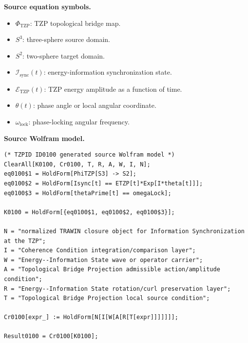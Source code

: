 \begin{minipage}[t]{0.49\linewidth}
\begingroup
\small
\raggedright
\textbf{Source equation symbols.}\par
\begin{itemize}[leftmargin=1.35em,itemsep=1pt,topsep=1pt,parsep=0pt]
    \item $\Phi_{\mathrm{TZP}}$: TZP topological bridge map.
    \item $S^3$: three-sphere source domain.
    \item $S^2$: two-sphere target domain.
    \item $\mathcal{I}_{\mathrm{sync}}(t)$: energy-information synchronization state.
    \item $\mathcal{E}_{\mathrm{TZP}}(t)$: TZP energy amplitude as a function of time.
    \item $\theta(t)$: phase angle or local angular coordinate.
    \item $\omega_{\mathrm{lock}}$: phase-locking angular frequency.
\end{itemize}
\endgroup
\end{minipage}\hfill
\begin{minipage}[t]{0.47\linewidth}
\begingroup
\scriptsize
\raggedright
\textbf{Source Wolfram model.}\par
\begin{Verbatim}[fontsize=\tiny,breaklines=true,breakanywhere=true]
(* TZPID ID0100 generated source Wolfram model *)
ClearAll[K0100, Cr0100, T, R, A, W, I, N];
eq0100$1 = HoldForm[PhiTZP[S3] -> S2];
eq0100$2 = HoldForm[Isync[t] == ETZP[t]*Exp[I*theta[t]]];
eq0100$3 = HoldForm[thetaPrime[t] == omegaLock];

K0100 = HoldForm[{eq0100$1, eq0100$2, eq0100$3}];

N = "normalized TRAWIN closure object for Information Synchronization at the TZP";
I = "Coherence Condition integration/comparison layer";
W = "Energy--Information State wave or operator carrier";
A = "Topological Bridge Projection admissible action/amplitude condition";
R = "Energy--Information State rotation/curl preservation layer";
T = "Topological Bridge Projection local source condition";

Cr0100[expr_] := HoldForm[N[I[W[A[R[T[expr]]]]]]];

Result0100 = Cr0100[K0100];
\end{Verbatim}
\endgroup
\end{minipage}

